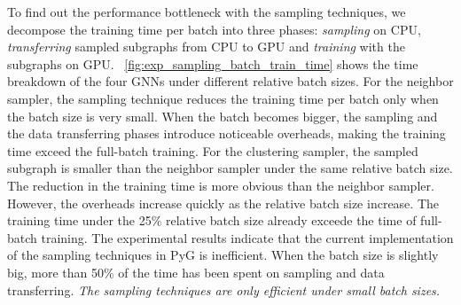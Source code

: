 To find out the performance bottleneck with the sampling techniques, we decompose the training time per batch into three phases: \emph{sampling} on CPU, \emph{transferring} sampled subgraphs from CPU to GPU and \emph{training} with the subgraphs on GPU.
\figurename~\ref{fig:exp_sampling_batch_train_time} shows the time breakdown of the four GNNs under different relative batch sizes.
For the neighbor sampler, the sampling technique reduces the training time per batch only when the batch size is very small.
When the batch becomes bigger, the sampling and the data transferring phases introduce noticeable overheads, making the training time exceed the full-batch training.
For the clustering sampler, the sampled subgraph is smaller than the neighbor sampler under the same relative batch size.
The reduction in the training time is more obvious than the neighbor sampler.
However, the overheads increase quickly as the relative batch size increase.
The training time under the 25\% relative batch size already exceede the time of full-batch training.
The experimental results indicate that the current implementation of the sampling techniques in PyG is inefficient.
When the batch size is slightly big, more than 50\% of the time has been spent on sampling and data transferring.
\emph{The sampling techniques are only efficient under small batch sizes.}

